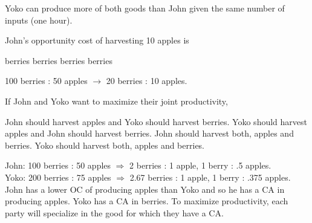 \documentclass[addpoints,11pt]{exam}
\theoremstyle{definition}
\begin{document}
\begin{questions}
		\begin{solution}
			Yoko can produce more of both goods than John given the same number of inputs (one hour).
		\end{solution}
		
	\question John's opportunity cost of harvesting 10 apples is
		\begin{choices}
			 berries
			 berries
			 berries
			 berries
		\end{choices}
		
		\begin{solution}
			100 berries : 50 apples $\rightarrow$ 20 berries : 10 apples.
		\end{solution}
		
	\question \label{blah2} If John and Yoko want to maximize their joint productivity,
		\begin{choices}
			\CorrectChoice John should harvest apples and Yoko should harvest berries.
			\choice Yoko should harvest apples and John should harvest berries.
			\choice John should harvest both, apples and berries.
			\choice Yoko should harvest both, apples and berries.
		\end{choices}
		
		\begin{solution}
			John: 100 berries : 50 apples $\Rightarrow$ 2 berries : 1 apple, 1 berry : .5 apples. 
		\\ Yoko: 200 berries : 75 apples $\Rightarrow$ 2.67 berries : 1 apple, 1 berry : .375 apples. John has a lower OC of producing apples than Yoko and so he has a CA in producing apples. Yoko has a CA in berries. To maximize productivity, each party will specialize in the good for which they have a CA.
		\end{solution}
				
		
\newpage
		

		
		

\end{questions}
\end{document}
